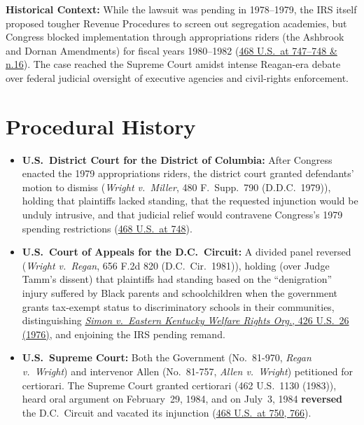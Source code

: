 \documentclass[12pt]{article}
\begin{document}
\textbf{Historical Context:} While the lawsuit was pending in 1978--1979, the IRS itself proposed tougher Revenue Procedures to screen out segregation academies, but Congress blocked implementation through appropriations riders (the Ashbrook and Dornan Amendments) for fiscal years 1980--1982 (\href{https://supreme.justia.com/cases/federal/us/468/737/}{468 U.S.\ at 747--748 \& n.16}). The case reached the Supreme Court amidst intense Reagan-era debate over federal judicial oversight of executive agencies and civil-rights enforcement.

\section{Procedural History}
\begin{itemize}
  \item \textbf{U.S.\ District Court for the District of Columbia:} After Congress enacted the 1979 appropriations riders, the district court granted defendants' motion to dismiss (\textit{Wright v.\ Miller}, 480 F.\ Supp.\ 790 (D.D.C.\ 1979)), holding that plaintiffs lacked standing, that the requested injunction would be unduly intrusive, and that judicial relief would contravene Congress's 1979 spending restrictions (\href{https://supreme.justia.com/cases/federal/us/468/737/}{468 U.S.\ at 748}).
  \item \textbf{U.S.\ Court of Appeals for the D.C.\ Circuit:} A divided panel reversed (\textit{Wright v.\ Regan}, 656 F.2d 820 (D.C.\ Cir.\ 1981)), holding (over Judge Tamm's dissent) that plaintiffs had standing based on the ``denigration'' injury suffered by Black parents and schoolchildren when the government grants tax-exempt status to discriminatory schools in their communities, distinguishing \href{https://supreme.justia.com/cases/federal/us/426/26/}{\textit{Simon v.\ Eastern Kentucky Welfare Rights Org.}, 426 U.S.\ 26 (1976)}, and enjoining the IRS pending remand.
  \item \textbf{U.S.\ Supreme Court:} Both the Government (No.\ 81-970, \textit{Regan v.\ Wright}) and intervenor Allen (No.\ 81-757, \textit{Allen v.\ Wright}) petitioned for certiorari. The Supreme Court granted certiorari (462 U.S.\ 1130 (1983)), heard oral argument on February~29, 1984, and on July~3, 1984 \textbf{reversed} the D.C.\ Circuit and vacated its injunction (\href{https://supreme.justia.com/cases/federal/us/468/737/}{468 U.S.\ at 750, 766}).
\end{itemize}
\end{document}
